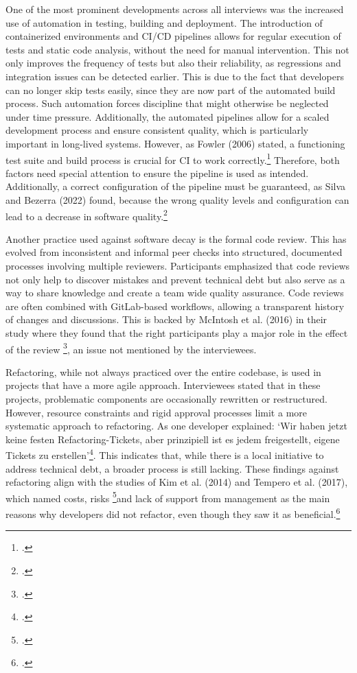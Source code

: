 One of the most prominent developments across all interviews was the increased use of automation in testing, building and deployment. The introduction of containerized environments and CI/CD pipelines allows for regular execution of tests and static code analysis, without the need for manual intervention.
This not only improves the frequency of tests but also their reliability, as regressions and integration issues can be detected earlier. This is due to the fact that developers can no longer skip tests easily, since they are now part of the automated build process.
Such automation forces discipline that might otherwise be neglected under time pressure. Additionally, the automated pipelines allow for a scaled development process and ensure consistent quality, which is particularly important in long-lived systems.
However, as Fowler (2006) stated, a functioning test suite and build process is crucial for CI to work correctly.\footcite[no page number]{fowlerContinuousIntegration2006} Therefore, both factors need special attention to ensure the pipeline is used as intended.
Additionally, a correct configuration of the pipeline must be guaranteed, as Silva and Bezerra (2022) found, because the wrong quality levels and configuration can lead to a decrease in software quality.\footcite[4]{silvaEmpiricalInvestigationInfluence2022}

Another practice used against software decay is the formal code review. This has evolved from inconsistent and informal peer checks into structured, documented processes involving multiple reviewers. Participants emphasized that code reviews not only help to discover mistakes and prevent technical debt but also
serve as a way to share knowledge and create a team wide quality assurance. Code reviews are often combined with GitLab-based workflows, allowing a transparent history of changes and discussions. This is backed by McIntosh et al. (2016) in their study where they found that the right participants play a major role in the effect of the review \footcite[39]{mcintoshEmpiricalStudyImpact2016},
an issue not mentioned by the interviewees.

Refactoring, while not always practiced over the entire codebase, is used in projects that have a more agile approach. Interviewees stated that in these projects, problematic components are occasionally rewritten or restructured. However, resource constraints and rigid approval processes limit a more systematic approach to refactoring.
As one developer explained: `Wir haben jetzt keine festen Refactoring-Tickets, aber prinzipiell ist es jedem freigestellt, eigene Tickets zu erstellen'\footcite{Interview22025}. This indicates that, while there is a local initiative to address technical debt, a broader process is still lacking.
These findings against refactoring align with the studies of Kim et al. (2014) and Tempero et al. (2017), which named costs, risks \footcite[17]{kimEmpiricalStudyRefactoring2014}and lack of support from management as the main reasons why developers did not refactor, even though they saw it as beneficial.\footcite[60]{temperoBarriersRefactoring2017}

